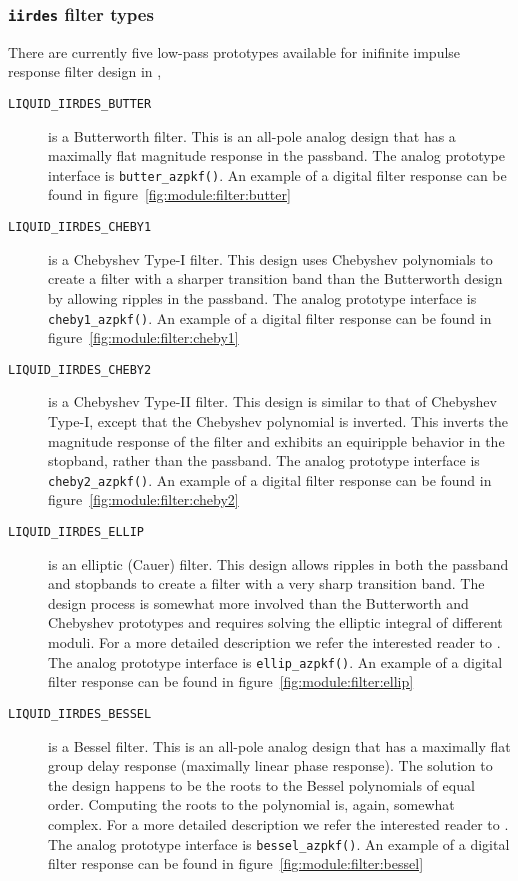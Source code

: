\subsubsection{{\tt iirdes} filter types}
\label{module:filter:iirdes:types}
There are currently five low-pass prototypes available for inifinite impulse
response filter design in \liquid,
\begin{description}
\item[{\tt LIQUID\_IIRDES\_BUTTER}]
    is a Butterworth filter.
    This is an all-pole analog design that has a maximally flat magnitude
    response in the passband.
    The analog prototype interface is {\tt butter\_azpkf()}.
    An example of a digital filter response can be found in
    figure~\ref{fig:module:filter:butter}
\item[{\tt LIQUID\_IIRDES\_CHEBY1}]
    is a Chebyshev Type-I filter.
    This design uses Chebyshev polynomials to create a filter with a sharper
    transition band than the Butterworth design by allowing ripples in the
    passband.
    The analog prototype interface is {\tt cheby1\_azpkf()}.
    An example of a digital filter response can be found in
    figure~\ref{fig:module:filter:cheby1}
\item[{\tt LIQUID\_IIRDES\_CHEBY2}]
    is a Chebyshev Type-II filter.
    This design is similar to that of Chebyshev Type-I, except that the
    Chebyshev polynomial is inverted.
    This inverts the magnitude response of the filter and exhibits an
    equiripple behavior in the stopband, rather than the passband.
    The analog prototype interface is {\tt cheby2\_azpkf()}.
    An example of a digital filter response can be found in
    figure~\ref{fig:module:filter:cheby2}
\item[{\tt LIQUID\_IIRDES\_ELLIP}]
    is an elliptic (Cauer) filter.
    This design allows ripples in both the passband and stopbands to create a
    filter with a very sharp transition band.
    The design process is somewhat more involved than the Butterworth and
    Chebyshev prototypes and requires solving the elliptic integral of
    different moduli.
    For a more detailed description we refer the interested reader to
    \cite{Orfanidis:2006}.
    The analog prototype interface is {\tt ellip\_azpkf()}.
    An example of a digital filter response can be found in
    figure~\ref{fig:module:filter:ellip}
\item[{\tt LIQUID\_IIRDES\_BESSEL}]
    is a Bessel filter.
    This is an all-pole analog design that has a maximally flat group delay
    response (maximally linear phase response).
    The solution to the design happens to be the roots to the Bessel
    polynomials of equal order.
    Computing the roots to the polynomial is, again, somewhat complex.
    For a more detailed description we refer the interested reader to
    \cite{Orchard:1965}.
    The analog prototype interface is {\tt bessel\_azpkf()}.
    An example of a digital filter response can be found in
    figure~\ref{fig:module:filter:bessel}
\end{description}

